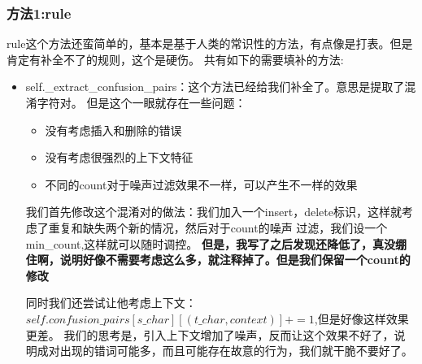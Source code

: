 \documentclass[answers]{exam}  %
\begin{document}
\subsubsection{方法1:rule}
rule这个方法还蛮简单的，基本是基于人类的常识性的方法，有点像是打表。但是肯定有补全不了的规则，这个是硬伤。
共有如下的需要填补的方法:
\begin{itemize}
    \item self.\_extract\_confusion\_pairs：这个方法已经给我们补全了。意思是提取了混淆字符对。
    但是这个一眼就存在一些问题：
    \begin{itemize}
        \item 没有考虑插入和删除的错误
        \item 没有考虑很强烈的上下文特征
        \item 不同的count对于噪声过滤效果不一样，可以产生不一样的效果
    \end{itemize}
    我们首先修改这个混淆对的做法：我们加入一个insert，delete标识，这样就考虑了重复和缺失两个新的情况，然后对于count的噪声
    过滤，我们设一个min\_count,这样就可以随时调控。
    \textbf{但是，我写了之后发现还降低了，真没绷住啊，说明好像不需要考虑这么多，就注释掉了。但是我们保留一个count的修改}
    
    同时我们还尝试让他考虑上下文：$self.confusion\_pairs[s\_char][(t\_char, context)] += 1$,但是好像这样效果更差。
    我们的思考是，引入上下文增加了噪声，反而让这个效果不好了，说明成对出现的错词可能多，而且可能存在故意的行为，我们就干脆不要好了。


\end{itemize}
\end{document}
